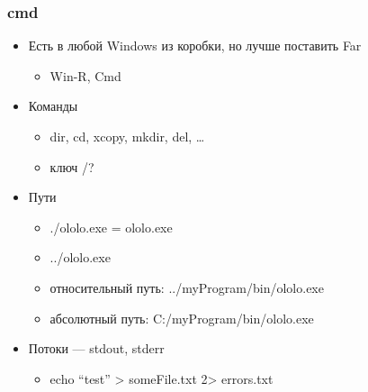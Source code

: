 \documentclass{../../slides-style}
\begin{document}
    \begin{frame}
        \frametitle{cmd}
        \begin{itemize}
            \item Есть в любой Windows из коробки, но лучше поставить Far
            \begin{itemize}
                \item Win-R, Cmd
            \end{itemize}
            \item Команды
            \begin{itemize}
                \item dir, cd, xcopy, mkdir, del, …
                \item ключ /?
            \end{itemize}
            \item Пути
            \begin{itemize}
                \item ./ololo.exe = ololo.exe
                \item ../ololo.exe
                \item относительный путь: ../myProgram/bin/ololo.exe
                \item абсолютный путь: C:/myProgram/bin/ololo.exe
            \end{itemize}
            \item Потоки --- stdout, stderr
            \begin{itemize}
                \item echo ``test'' > someFile.txt 2> errors.txt
            \end{itemize}
        \end{itemize}
    \end{frame}
\end{document}
